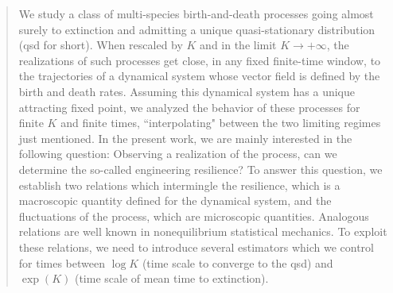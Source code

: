 \documentclass[JEP,XML,SOM,Unicode]{cedram}
\numberwithin{equation}{section}
\theoremstyle{plain}
\theoremstyle{definition}
\begin{document}
\begin{abstract}
We study a class of multi-species birth-and-death processes going almost surely to extinction and admitting a unique quasi-stationary distribution (qsd for short). When rescaled by $K$ and in the limit $K\to+\infty$, the realizations of such processes get close, in any fixed finite-time window, to the trajectories of a dynamical system whose vector field is defined by the birth and death rates. Assuming this dynamical system has a unique attracting fixed point, we analyzed the behavior of these processes for finite $K$ and finite times, ``interpolating" between the two limiting regimes just mentioned. In the present work, we are mainly interested in the following question: Observing a realization of the process, can we determine the so-called engineering resilience? To answer this question, we establish two relations which intermingle the resilience, which is a macroscopic quantity defined for the dynamical system, and the fluctuations of the process, which are microscopic quantities. Analogous relations are well known in nonequilibrium statistical mechanics. To exploit these relations, we need to introduce several estimators which we control for times between $\log K$ (time scale to converge to the qsd) and $\exp(K)$ (time scale of mean time to extinction).
\end{abstract}




\end{document}
